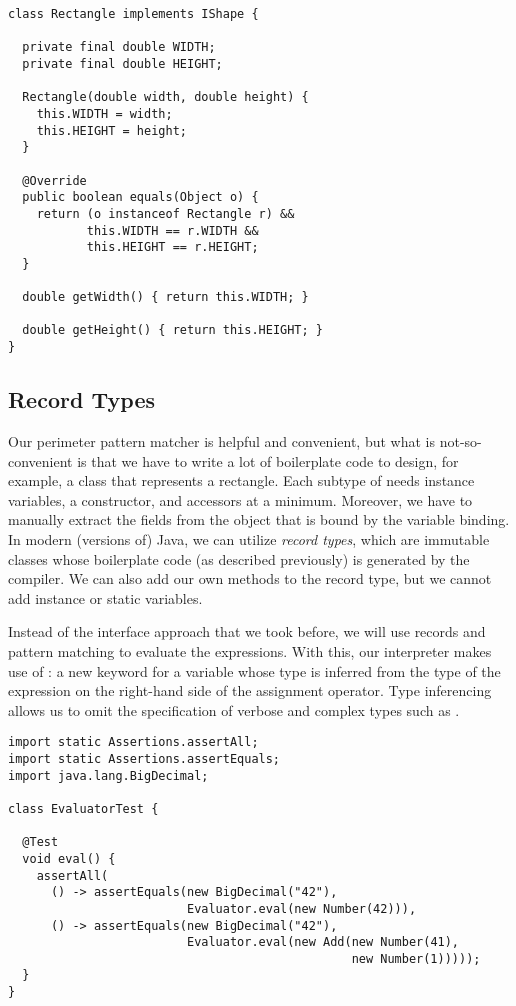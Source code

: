 \begin{lstlisting}[language=MyJava]
class Rectangle implements IShape {

  private final double WIDTH;
  private final double HEIGHT;

  Rectangle(double width, double height) {
    this.WIDTH = width;
    this.HEIGHT = height;
  }

  @Override
  public boolean equals(Object o) {
    return (o instanceof Rectangle r) &&
           this.WIDTH == r.WIDTH &&
           this.HEIGHT == r.HEIGHT;
  }

  double getWidth() { return this.WIDTH; }

  double getHeight() { return this.HEIGHT; }
}
\end{lstlisting}

\subsection{Record Types}

Our perimeter pattern matcher is helpful and convenient, but what is not-so-convenient is that we have to write a lot of boilerplate code to design, for example, a class that represents a rectangle. 
Each subtype of  needs instance variables, a constructor, and accessors at a minimum. 
Moreover, we have to manually extract the fields from the object that is bound by the variable binding. 
In modern (versions of) Java, we can utilize \emph{record types}, which are immutable classes whose boilerplate code (as described previously) is generated by the compiler. 
We can also add our own methods to the record type, but we cannot add instance or static variables.

Instead of the interface approach that we took before, we will use records and pattern matching to evaluate the expressions. 
With this, our interpreter makes use of : a new keyword for a variable whose type is inferred from the type of the expression on the right-hand side of the assignment operator. 
Type inferencing allows us to omit the specification of verbose and complex types such as .

\begin{lstlisting}[language=MyJava]
import static Assertions.assertAll;
import static Assertions.assertEquals;
import java.lang.BigDecimal;

class EvaluatorTest {

  @Test
  void eval() {
    assertAll(
      () -> assertEquals(new BigDecimal("42"),
                         Evaluator.eval(new Number(42))),
      () -> assertEquals(new BigDecimal("42"),
                         Evaluator.eval(new Add(new Number(41), 
                                                new Number(1)))));
  }
}
\end{lstlisting}


